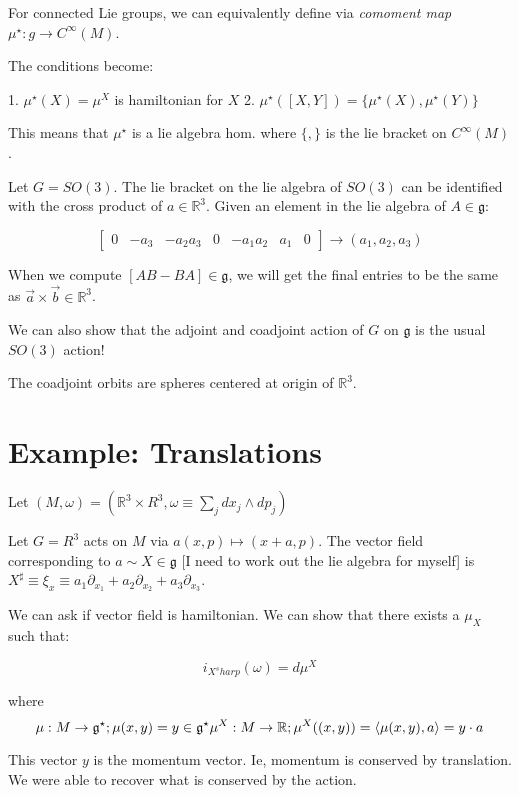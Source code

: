 \documentclass[11pt]{book}
\newcommand{\R}{\ensuremath{\mathbb R}}
\begin{document}
For connected Lie groups, we can equivalently define via \emph{comoment map}
$\mu^\star: g \rightarrow C^\infty(M)$.

The conditions become:

1. $\mu^\star(X) = \mu^X$ is hamiltonian for $X$
2. $\mu^\star([X, Y]) =\{ \mu^\star(X), \mu^\star(Y) \}$

This means that $\mu^\star$ is a lie algebra hom. where $\{,\}$ is the lie
bracket on $C^\infty(M)$.


Let $G = SO(3)$. The lie bracket on the lie algebra of $SO(3)$ can be
identified with the cross product of $a \in \R^3$. Given an element
in the lie algebra of $A \in \mathfrak g$:

$$
\begin{bmatrix}
0 & -a_3 & -a_2
a_3 & 0 & -a_1
a_2 & a_1 & 0
\end{bmatrix}
\rightarrow (a_1, a_2, a_3)
$$

When we compute $[AB - BA] \in \mathfrak g$,
we will get the final entries to be the same as $\vec a \times \vec b \in \R^3$.

We can also show that the adjoint and coadjoint action of $G$ on $\mathfrak g$
is the usual $SO(3)$ action!

The coadjoint orbits are spheres centered at origin of $\mathbb R^3$.


\section{Example: Translations}

Let $(M, \omega) = (\R^3 \times R^3, \omega \equiv \sum_j dx_j \wedge dp_j)$

Let $G = R^3$ acts on $M$ via $a (x, p) \mapsto (x+a, p)$. The vector
field corresponding to $a \sim X \in \mathfrak g$ [I need to work out the lie algebra for myself]
is $X^\sharp \equiv \xi_x \equiv a_1 \partial_{x_1} + a_2 \partial_{x_2} + a_3 \partial_{x_3}$.

We can ask if vector field is hamiltonian. We can show that there exists a $\mu_X$
such that:

$$
i_{X^sharp}(\omega) = d \mu^X
$$   

where
$$
\mu: M \rightarrow \mathfrak g^\star; \mu(x, y) = y \in \mathfrak g^\star \\
\mu^X: M \rightarrow \R; \mu^X((x, y)) = \langle \mu(x, y), a \rangle = y \cdot a 
$$

This vector $y$ is the momentum vector. Ie, momentum is conserved by translation.
We were able to recover what is conserved by the action.
\end{document}
